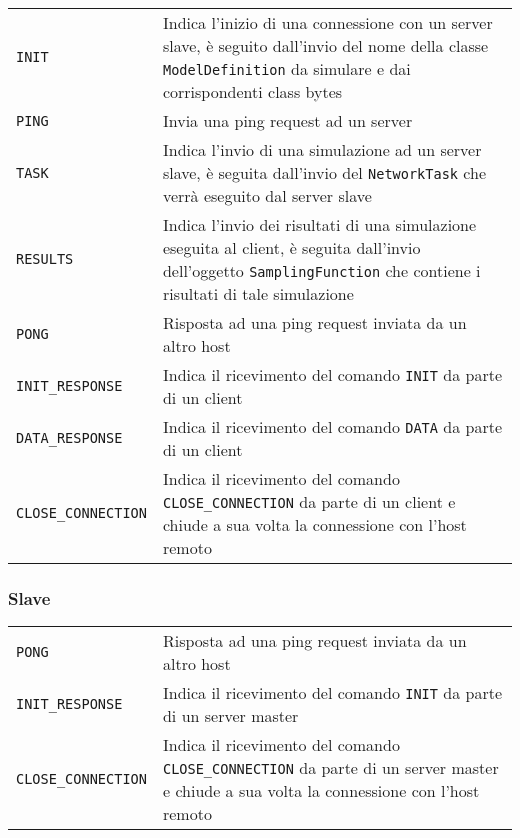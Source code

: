 \begin{table}[H]
    \begin{tabularx}{\linewidth}{ l X }
        \texttt{INIT} & Indica l'inizio di una connessione con un server slave, è seguito dall'invio del nome della classe \texttt{ModelDefinition} da simulare e dai corrispondenti class bytes \\
        \texttt{PING} & Invia una ping request ad un server \\
        \texttt{TASK} & Indica l'invio di una simulazione ad un server slave, è seguita dall'invio del \texttt{NetworkTask} che verrà eseguito dal server slave \\
        \texttt{RESULTS} & Indica l'invio dei risultati di una simulazione eseguita al client, è seguita dall'invio dell'oggetto \texttt{SamplingFunction} che contiene i risultati di tale simulazione \\
        \texttt{PONG} & Risposta ad una ping request inviata da un altro host \\
        \texttt{INIT\_RESPONSE} & Indica il ricevimento del comando \texttt{INIT} da parte di un client \\
        \texttt{DATA\_RESPONSE} & Indica il ricevimento del comando \texttt{DATA} da parte di un client\\
        \texttt{CLOSE\_CONNECTION} & Indica il ricevimento del comando \texttt{CLOSE\_CONNECTION} da parte di un client e chiude a sua volta la connessione con l'host remoto \\
    \end{tabularx}
\end{table}

\subsubsection{Slave}

\begin{table}[H]
    \begin{tabularx}{\linewidth}{ l X }
        \texttt{PONG} & Risposta ad una ping request inviata da un altro host \\
        \texttt{INIT\_RESPONSE} & Indica il ricevimento del comando \texttt{INIT} da parte di un server master \\
        \texttt{CLOSE\_CONNECTION} & Indica il ricevimento del comando \texttt{CLOSE\_CONNECTION} da parte di un server master e chiude a sua volta la connessione con l'host remoto \\
    \end{tabularx}
\end{table}

